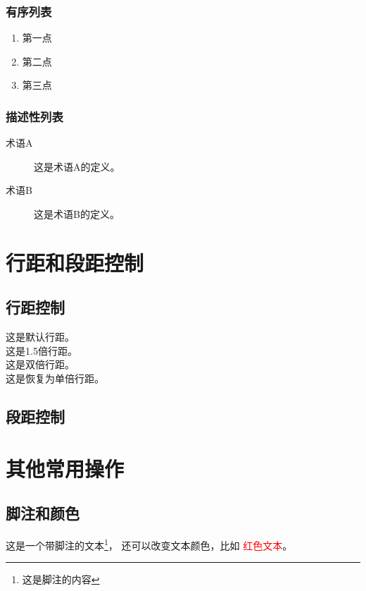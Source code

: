 \documentclass[a4paper,12pt]{report} %
\begin{document}
\subsection{有序列表}
\begin{enumerate}
    \item 第一点
    \item 第二点
    \item 第三点
\end{enumerate}

\subsection{描述性列表}
\begin{description}
    \item[术语A] 这是术语A的定义。
    \item[术语B] 这是术语B的定义。
\end{description}

\chapter{行距和段距控制}

\section{行距控制}
这是默认行距。\\
\onehalfspacing
这是1.5倍行距。\\
\doublespacing
这是双倍行距。\\
\singlespacing
这是恢复为单倍行距。

\section{段距控制}
\setlength{\parskip}{1em} %

\chapter{其他常用操作}

\section{脚注和颜色}
这是一个带脚注的文本\footnote{这是脚注的内容}，
还可以改变文本颜色，比如 \textcolor{red}{红色文本}。
\end{document}
